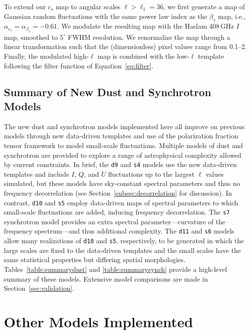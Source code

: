 \documentclass[twocolumn]{aastex631}
\begin{document}
To extend our $c_s$ map to angular scales $\ell > \ell_1 = 36$, we first generate a map of Gaussian random fluctuations with the same power law index as the $\beta_s$ map, i.e., $\alpha _{c_s}=\alpha _{\beta_s} = -0.61$. We modulate the resulting map with the Haslam 408\,GHz $I$ map, smoothed to $5^\circ$ FWHM resolution. We renormalize the map through a linear transformation such that the (dimensionless) pixel values range from 0.1--2. Finally, the modulated high-$\ell$ map is combined with the low-$\ell$ template following the filter function of Equation~\ref{eq:filter}.

\subsection{Summary of New Dust and Synchrotron Models}

The new dust and synchrotron models implemented here all improve on previous models through new data-driven templates and use of the polarization fraction tensor framework to model small-scale fluctuations. Multiple models of dust and synchrotron are provided to explore a range of astrophysical complexity allowed by current constraints. In brief, the \texttt{d9} and \texttt{s4} models use the new data-driven templates and include $I$, $Q$, and $U$ fluctuations up to the largest $\ell$ values simulated, but these models have sky-constant spectral parameters and thus no frequency decorrelation (see Section~\ref{subsec:decorrelation} for discussion). In contrast, \texttt{d10} and \texttt{s5} employ data-driven maps of spectral parameters to which small-scale fluctuations are added, inducing frequency decorrelation. The \texttt{s7} synchrotron model provides an extra spectral parameter---curvature of the frequency spectrum---and thus additional complexity. The \texttt{d11} and \texttt{s6} models allow many realizations of \texttt{d10} and \texttt{s5}, respectively, to be generated in which the large scales are fixed to the data-driven templates and the small scales have the same statistical properties but differing spatial morphologies. Tables~\ref{table:summarydust} and \ref{table:summarysynch} provide a high-level summary of these models. Extensive model comparisons are made in Section~\ref{sec:validation}.

\section{Other Models Implemented} \label{sec:other_models}
\end{document}
